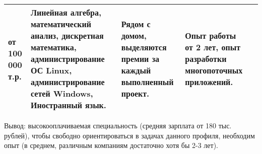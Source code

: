 \begin{landscape}
\begin{table}[H]
\begin{center}
\begin{small}
\begin{tabular}{|p{1.1cm}|p{6cm}|p{5.2cm}|p{4cm}|p{4cm}|}
			от 100 000 т.р. & Линейная алгебра, математический анализ, дискретная математика, администрирование ОС Linux, администрирование сетей Windows, Иностранный язык.& Рядом с домом, выделяются премии за каждый выполненный проект.& Опыт работы от 2 лет, опыт разработки многопоточных приложений.\\
			\hline
		\end{tabular}
	\end{small}
	\end{center}
\end{table}
Вывод: высокооплачиваемая специальность (средняя зарплата от 180 тыс. рублей), чтобы свободно ориентироваться в задачах данного профиля, необходим опыт (в среднем, различным компаниям достаточно хотя бы 2-3 лет).
\end{landscape}

